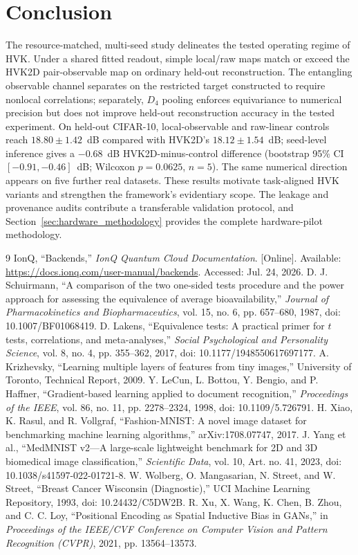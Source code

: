 \documentclass[11pt]{article}
\begin{document}
\section{Conclusion}
The resource-matched, multi-seed study delineates the tested operating regime of HVK. Under a shared fitted readout, simple local/raw maps match or exceed the HVK2D pair-observable map on ordinary held-out reconstruction. The entangling observable channel separates on the restricted target constructed to require nonlocal correlations; separately, $D_4$ pooling enforces equivariance to numerical precision but does not improve held-out reconstruction accuracy in the tested experiment. On held-out CIFAR-10, local-observable and raw-linear controls reach $18.80\pm1.42$~dB compared with HVK2D's $18.12\pm1.54$~dB; seed-level inference gives a $-0.68$~dB HVK2D-minus-control difference (bootstrap 95\% CI $[-0.91,-0.46]$~dB; Wilcoxon $p=0.0625$, $n=5$). The same numerical direction appears on five further real datasets. These results motivate task-aligned HVK variants and strengthen the framework's evidentiary scope. The leakage and provenance audits contribute a transferable validation protocol, and Section~\ref{sec:hardware_methodology} provides the complete hardware-pilot methodology.

\begin{thebibliography}{9}
 IonQ, ``Backends,'' \textit{IonQ Quantum Cloud Documentation}. [Online]. Available: \url{https://docs.ionq.com/user-manual/backends}. Accessed: Jul. 24, 2026.
 D. J. Schuirmann, ``A comparison of the two one-sided tests procedure and the power approach for assessing the equivalence of average bioavailability,'' \textit{Journal of Pharmacokinetics and Biopharmaceutics}, vol. 15, no. 6, pp. 657--680, 1987, doi: 10.1007/BF01068419.
 D. Lakens, ``Equivalence tests: A practical primer for $t$ tests, correlations, and meta-analyses,'' \textit{Social Psychological and Personality Science}, vol. 8, no. 4, pp. 355--362, 2017, doi: 10.1177/1948550617697177.
 A. Krizhevsky, ``Learning multiple layers of features from tiny images,'' University of Toronto, Technical Report, 2009.
 Y. LeCun, L. Bottou, Y. Bengio, and P. Haffner, ``Gradient-based learning applied to document recognition,'' \textit{Proceedings of the IEEE}, vol. 86, no. 11, pp. 2278--2324, 1998, doi: 10.1109/5.726791.
 H. Xiao, K. Rasul, and R. Vollgraf, ``Fashion-MNIST: A novel image dataset for benchmarking machine learning algorithms,'' arXiv:1708.07747, 2017.
 J. Yang et al., ``MedMNIST v2---A large-scale lightweight benchmark for 2D and 3D biomedical image classification,'' \textit{Scientific Data}, vol. 10, Art. no. 41, 2023, doi: 10.1038/s41597-022-01721-8.
 W. Wolberg, O. Mangasarian, N. Street, and W. Street, ``Breast Cancer Wisconsin (Diagnostic),'' UCI Machine Learning Repository, 1993, doi: 10.24432/C5DW2B.
 R. Xu, X. Wang, K. Chen, B. Zhou, and C. C. Loy, ``Positional Encoding as Spatial Inductive Bias in GANs,'' in \textit{Proceedings of the IEEE/CVF Conference on Computer Vision and Pattern Recognition (CVPR)}, 2021, pp. 13564--13573.
\end{thebibliography}
\end{document}
